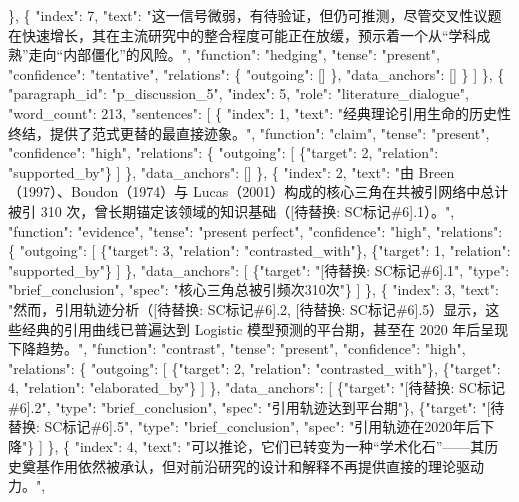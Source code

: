 \documentclass[12pt,a4paper]{article}
\begin{document}
        \},
        \{
          "index": 7,
          "text": "这一信号微弱，有待验证，但仍可推测，尽管交叉性议题在快速增长，其在主流研究中的整合程度可能正在放缓，预示着一个从“学科成熟”走向“内部僵化”的风险。",
          "function": "hedging",
          "tense": "present",
          "confidence": "tentative",
          "relations": \{
            "outgoing": []
          \},
          "data\_anchors": []
        \}
      ]
    \},
    \{
      "paragraph\_id": "p\_discussion\_5",
      "index": 5,
      "role": "literature\_dialogue",
      "word\_count": 213,
      "sentences": [
        \{
          "index": 1,
          "text": "经典理论引用生命的历史性终结，提供了范式更替的最直接迹象。",
          "function": "claim",
          "tense": "present",
          "confidence": "high",
          "relations": \{
            "outgoing": [
              \{"target": 2, "relation": "supported\_by"\}
            ]
          \},
          "data\_anchors": []
        \},
        \{
          "index": 2,
          "text": "由 Breen（1997）、Boudon（1974）与 Lucas（2001）构成的核心三角在共被引网络中总计被引 310 次，曾长期锚定该领域的知识基础（[待替换: SC标记\#6].1）。",
          "function": "evidence",
          "tense": "present perfect",
          "confidence": "high",
          "relations": \{
            "outgoing": [
              \{"target": 3, "relation": "contrasted\_with"\},
              \{"target": 1, "relation": "supported\_by"\}
            ]
          \},
          "data\_anchors": [
            \{"target": "[待替换: SC标记\#6].1", "type": "brief\_conclusion", "spec": "核心三角总被引频次310次"\}
          ]
        \},
        \{
          "index": 3,
          "text": "然而，引用轨迹分析（[待替换: SC标记\#6].2, [待替换: SC标记\#6].5）显示，这些经典的引用曲线已普遍达到 Logistic 模型预测的平台期，甚至在 2020 年后呈现下降趋势。",
          "function": "contrast",
          "tense": "present",
          "confidence": "high",
          "relations": \{
            "outgoing": [
              \{"target": 2, "relation": "contrasted\_with"\},
              \{"target": 4, "relation": "elaborated\_by"\}
            ]
          \},
          "data\_anchors": [
            \{"target": "[待替换: SC标记\#6].2", "type": "brief\_conclusion", "spec": "引用轨迹达到平台期"\},
            \{"target": "[待替换: SC标记\#6].5", "type": "brief\_conclusion", "spec": "引用轨迹在2020年后下降"\}
          ]
        \},
        \{
          "index": 4,
          "text": "可以推论，它们已转变为一种“学术化石”——其历史奠基作用依然被承认，但对前沿研究的设计和解释不再提供直接的理论驱动力。",
\end{document}
